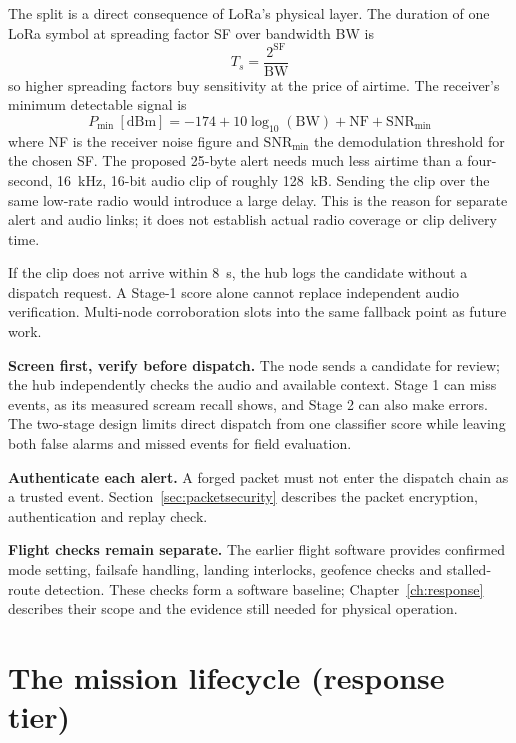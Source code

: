 \documentclass[12pt,a4paper]{report}
\begin{document}
The split is a direct consequence of LoRa's physical layer. The
duration of one LoRa symbol at spreading factor SF over bandwidth BW
is
\begin{equation}
\label{eq:symtime}
T_s = \frac{2^{\mathrm{SF}}}{\mathrm{BW}}
\end{equation}
so higher spreading factors buy sensitivity at the price of airtime.
The receiver's minimum detectable signal is
\begin{equation}
\label{eq:sens}
P_{\min}\ [\mathrm{dBm}] = -174 + 10\log_{10}(\mathrm{BW}) +
\mathrm{NF} + \mathrm{SNR}_{\min}
\end{equation}
where NF is the receiver noise figure and $\mathrm{SNR}_{\min}$ the
demodulation threshold for the chosen SF.
The proposed 25-byte alert needs much less airtime than a four-second,
16~kHz, 16-bit audio clip of roughly 128~kB. Sending the clip over the
same low-rate radio would introduce a large delay. This is the reason
for separate alert and audio links; it does not establish actual radio
coverage or clip delivery time.

If the clip does not arrive within 8~s, the hub logs the candidate
without a dispatch request. A Stage-1 score alone cannot replace
independent audio verification. Multi-node corroboration
slots into the same fallback point as future work.

\textbf{Screen first, verify before dispatch.} The node sends a
candidate for review; the hub independently checks the audio and
available context. Stage 1 can miss events, as its measured scream
recall shows, and Stage 2 can also make errors. The two-stage design
limits direct dispatch from one classifier score while leaving both
false alarms and missed events for field evaluation.

\textbf{Authenticate each alert.} A forged packet must not enter the
dispatch chain as a trusted event. Section~\ref{sec:packetsecurity}
describes the packet encryption, authentication and replay check.

\textbf{Flight checks remain separate.} The earlier flight software
provides confirmed mode setting, failsafe handling, landing interlocks,
geofence checks and stalled-route detection. These checks form a
software baseline; Chapter~\ref{ch:response} describes their scope
and the evidence still needed for physical operation.

\section{The mission lifecycle (response tier)}
\label{sec:lifecycle}
\end{document}
